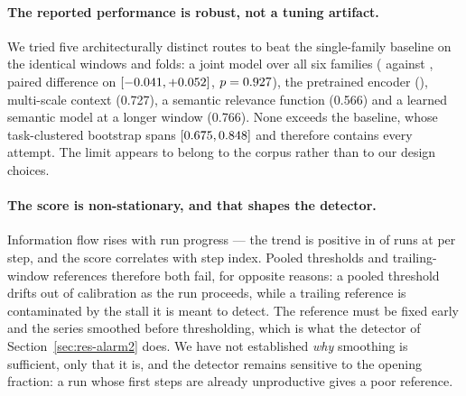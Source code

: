 \paragraph{The reported performance is robust, not a tuning artifact.} We tried five architecturally
distinct routes to beat the single-family baseline on the identical windows and folds: a joint model over
all six families (\pjointAuc{} against \pceilBase{}, paired difference \pjointDiff{} on
$[-0.041{},+0.052{}]$, $p=0.927{}$), the pretrained encoder (\pprobeRocEnc{}), multi-scale context
(0.727), a semantic relevance function (0.566) and a learned semantic model at a longer window (0.766).
None exceeds the baseline, whose task-clustered bootstrap spans $[0.675{},0.848{}]$ and therefore
contains every attempt. The limit appears to belong to the corpus rather than to our design choices.

\paragraph{The score is non-stationary, and that shapes the detector.} Information flow rises with run
progress --- the trend is positive in \pdrRunsPositiveTrend{} of \pdrRunsPositiveTrendMax{} runs at
\pdrMeanSlope{} per step, and the score correlates \pdrCorrStep{} with step index. Pooled thresholds and
trailing-window references therefore both fail, for opposite reasons: a pooled threshold drifts out of
calibration as the run proceeds, while a trailing reference is contaminated by the stall it is meant to
detect. The reference must be fixed early and the series smoothed before thresholding, which is what the
detector of Section~\ref{sec:res-alarm2} does. We have not established \emph{why} smoothing is sufficient,
only that it is, and the detector remains sensitive to the opening fraction: a run whose first steps are
already unproductive gives a poor reference.

